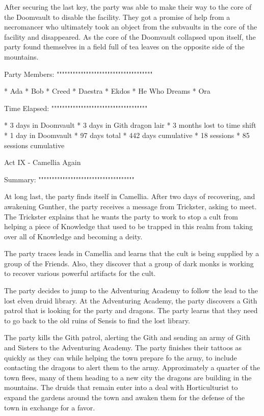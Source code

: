 After securing the last key, the party was able to make their way to the core of the Doomvault to disable the facility.
They got a promise of help from a necromancer who ultimately took an object from the subvaults in the core of the facility and disappeared.
As the core of the Doomvault collapsed upon itself, the party found themselves in a field full of tea leaves on the opposite side of the mountains.

Party Members:
""""""""""""""""""""""""""""""""""""

  * Ada
  * Bob
  * Creed
  * Daestra
  * Ekdos
  * He Who Dreams
  * Ora

Time Elapsed:
""""""""""""""""""""""""""""""""""""

  * 3 days in Doomvault
  * 3 days in Gith dragon lair
  * 3 months lost to time shift
  * 1 day in Doomvault
  * 97 days total
  * 442 days cumulative
  * 18 sessions
  * 85 sessions cumulative

Act IX - Camellia Again
^^^^^^^^^^^^^^^^^^^^^^^^^^^^^^^^^^^^

Summary:
""""""""""""""""""""""""""""""""""""

At long last, the party finds itself in Camellia.
After two days of recovering, and awakening Gunther, the party receives a message from Trickster, asking to meet.
The Trickster explains that he wants the party to work to stop a cult from helping a piece of Knowledge that used to be trapped in this realm from taking over all of Knowledge and becoming a deity.

The party traces leads in Camellia and learns that the cult is being supplied by a group of the Friends.
Also, they discover that a group of dark monks is working to recover various powerful artifacts for the cult.

The party decides to jump to the Adventuring Academy to follow the lead to the lost elven druid library.
At the Adventuring Academy, the party discovers a Gith patrol that is looking for the party and dragons.
The party learns that they need to go back to the old ruins of Sensis to find the lost library.

The party kills the Gith patrol, alerting the Gith and sending an army of Gith and Sisters to the Adventuring Academy.
The party finishes their tattoos as quickly as they can while helping the town prepare fo the army, to include contacting the dragons to alert them to the army.
Approximately a quarter of the town flees, many of them heading to a new city the dragons are building in the mountains.
The druids that remain enter into a deal with Horticulturist to expand the gardens around the town and awaken them for the defense of the town in exchange for a favor.

